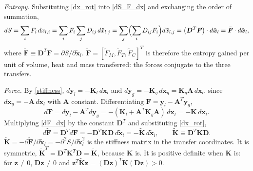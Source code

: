 \emph{Entropy.} Substituting \eqref{dx_rot} into \eqref{dS_F_dx} and exchanging the order of summation,
\begin{equation}\label{dS_f}
dS=\sum_iF_i\,dx_{l,i}=\sum_iF_i\sum_jD_{ij}\,d\tilde{x}_{l,j}=\sum_j\Bigl(\sum_iD_{ij}F_i\Bigr)d\tilde{x}_{l,j}=\bigl(\boldsymbol{D}^T\boldsymbol{F}\bigr)\cdot d\tilde{\boldsymbol{x}}_l=\tilde{\boldsymbol{F}}\cdot d\tilde{\boldsymbol{x}}_l,
\end{equation}
where $\tilde{\boldsymbol{F}}\equiv\boldsymbol{D}^T\boldsymbol{F}=\partial S/\partial\tilde{\boldsymbol{x}}_l$. $\tilde{\boldsymbol{F}}=[\tilde{F}_M,\tilde{F}_T,\tilde{F}_C]^T$ is therefore the entropy gained per unit of volume, heat and mass transferred: the forces conjugate to the three transfers.

\emph{Force.} By \eqref{stiffness}, $d\boldsymbol{y}_l=-\boldsymbol{K}_l\,d\boldsymbol{x}_l$ and $d\boldsymbol{y}_g=-\boldsymbol{K}_g\,d\boldsymbol{x}_g=\boldsymbol{K}_g\boldsymbol{A}\,d\boldsymbol{x}_l$, since $d\boldsymbol{x}_g=-\boldsymbol{A}\,d\boldsymbol{x}_l$ with $\boldsymbol{A}$ constant. Differentiating $\boldsymbol{F}=\boldsymbol{y}_l-\boldsymbol{A}^T\boldsymbol{y}_g$,
\begin{equation}\label{dF_dx}
d\boldsymbol{F}=d\boldsymbol{y}_l-\boldsymbol{A}^Td\boldsymbol{y}_g=-(\boldsymbol{K}_l+\boldsymbol{A}^T\boldsymbol{K}_g\boldsymbol{A})\,d\boldsymbol{x}_l=-\boldsymbol{K}\,d\boldsymbol{x}_l .
\end{equation}
Multiplying \eqref{dF_dx} by the constant $\boldsymbol{D}^T$ and substituting \eqref{dx_rot},
\begin{equation}\label{df_rot}
d\tilde{\boldsymbol{F}}=\boldsymbol{D}^Td\boldsymbol{F}=-\boldsymbol{D}^T\boldsymbol{K}\boldsymbol{D}\,d\tilde{\boldsymbol{x}}_l=-\tilde{\boldsymbol{K}}\,d\tilde{\boldsymbol{x}}_l,\qquad \tilde{\boldsymbol{K}}\equiv\boldsymbol{D}^T\boldsymbol{K}\boldsymbol{D} .
\end{equation}
$\tilde{\boldsymbol{K}}=-\partial\tilde{\boldsymbol{F}}/\partial\tilde{\boldsymbol{x}}_l=-\partial^2S/\partial\tilde{\boldsymbol{x}}_l^2$ is the stiffness matrix in the transfer coordinates. It is symmetric, $\tilde{\boldsymbol{K}}^T=\boldsymbol{D}^T\boldsymbol{K}^T\boldsymbol{D}=\tilde{\boldsymbol{K}}$, because $\boldsymbol{K}$ is. It is positive definite when $\boldsymbol{K}$ is: for $\boldsymbol{z}\neq0$, $\boldsymbol{D}\boldsymbol{z}\neq0$ and $\boldsymbol{z}^T\tilde{\boldsymbol{K}}\boldsymbol{z}=(\boldsymbol{D}\boldsymbol{z})^T\boldsymbol{K}(\boldsymbol{D}\boldsymbol{z})>0$.


